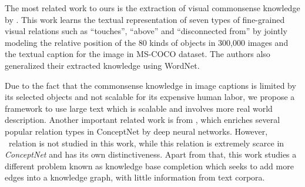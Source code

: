 The most related work to ours is the extraction of
visual commonsense knowledge by \cite{yatskar2016stating}. 
This work learns the textual representation of seven types of fine-grained 
visual relations such as ``touches'', ``above'' and ``disconnected from'' by jointly modeling the relative position of the 80 kinds of objects in 300,000 images
and the textual caption for the image in MS-COCO dataset\cite{lin2014microsoft}. 
The authors also generalized their extracted knowledge using WordNet. 

Due to the fact that the commonsense knowledge in image captions is limited by its selected objects and not scalable for its expensive human labor, we propose a framework to use large text which is scalable and involves more real world description. 
Another important related work is from \cite{li2016commonsense}, which enriches several popular relation types in ConceptNet by deep neural networks.
However, \lnear~relation is not studied in this work, while this relation is extremely scarce in \textit{ConceptNet} and has its own distinctiveness. 
Apart from that, this work studies a different problem known as knowledge base completion which seeks to add more edges into a knowledge graph, with little information from
text corpora. 
